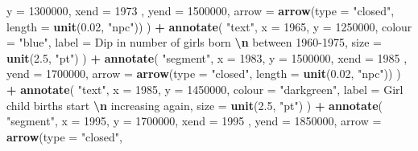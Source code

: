 \documentclass[11pt,a4paper,]{article}
\newenvironment{Shaded}{\begin{snugshade}}{\end{snugshade}}
\newcommand{\AttributeTok}[1]{\textcolor[rgb]{0.13,0.29,0.53}{#1}}
\newcommand{\DecValTok}[1]{\textcolor[rgb]{0.00,0.00,0.81}{#1}}
\newcommand{\FloatTok}[1]{\textcolor[rgb]{0.00,0.00,0.81}{#1}}
\newcommand{\FunctionTok}[1]{\textcolor[rgb]{0.13,0.29,0.53}{\textbf{#1}}}
\newcommand{\NormalTok}[1]{#1}
\newcommand{\SpecialCharTok}[1]{\textcolor[rgb]{0.81,0.36,0.00}{\textbf{#1}}}
\newcommand{\StringTok}[1]{\textcolor[rgb]{0.31,0.60,0.02}{#1}}
\begin{document}
\begin{Shaded}
\begin{Highlighting}[]
    \AttributeTok{y =} \DecValTok{1300000}\NormalTok{,}
    \AttributeTok{xend =} \DecValTok{1973}\NormalTok{  ,}
    \AttributeTok{yend =} \DecValTok{1500000}\NormalTok{,}
    \AttributeTok{arrow =} \FunctionTok{arrow}\NormalTok{(}\AttributeTok{type =} \StringTok{"closed"}\NormalTok{,}
                  \AttributeTok{length =} \FunctionTok{unit}\NormalTok{(}\FloatTok{0.02}\NormalTok{, }\StringTok{"npc"}\NormalTok{))}
\NormalTok{  ) }\SpecialCharTok{+}
  \FunctionTok{annotate}\NormalTok{(}
    \StringTok{"text"}\NormalTok{,}
    \AttributeTok{x =} \DecValTok{1965}\NormalTok{,}
    \AttributeTok{y =} \DecValTok{1250000}\NormalTok{,}
    \AttributeTok{colour =} \StringTok{"blue"}\NormalTok{,}
    \AttributeTok{label =} \StringTok{\textquotesingle{}Dip in number of girls born }\SpecialCharTok{\textbackslash{}n}\StringTok{ between 1960{-}1975\textquotesingle{}}\NormalTok{,}
    \AttributeTok{size =} \FunctionTok{unit}\NormalTok{(}\FloatTok{2.5}\NormalTok{, }\StringTok{"pt"}\NormalTok{)}
\NormalTok{  ) }\SpecialCharTok{+}
  \FunctionTok{annotate}\NormalTok{(}
    \StringTok{"segment"}\NormalTok{,}
    \AttributeTok{x =} \DecValTok{1983}\NormalTok{,}
    \AttributeTok{y =} \DecValTok{1500000}\NormalTok{,}
    \AttributeTok{xend =} \DecValTok{1985}\NormalTok{  ,}
    \AttributeTok{yend =} \DecValTok{1700000}\NormalTok{,}
    \AttributeTok{arrow =} \FunctionTok{arrow}\NormalTok{(}\AttributeTok{type =} \StringTok{"closed"}\NormalTok{,}
                  \AttributeTok{length =} \FunctionTok{unit}\NormalTok{(}\FloatTok{0.02}\NormalTok{, }\StringTok{"npc"}\NormalTok{))}
\NormalTok{  ) }\SpecialCharTok{+}
  \FunctionTok{annotate}\NormalTok{(}
    \StringTok{"text"}\NormalTok{,}
    \AttributeTok{x =} \DecValTok{1985}\NormalTok{,}
    \AttributeTok{y =} \DecValTok{1450000}\NormalTok{,}
    \AttributeTok{colour =} \StringTok{"darkgreen"}\NormalTok{,}
    \AttributeTok{label =} \StringTok{\textquotesingle{}Girl child births start }\SpecialCharTok{\textbackslash{}n}\StringTok{ increasing again\textquotesingle{}}\NormalTok{,}
    \AttributeTok{size =} \FunctionTok{unit}\NormalTok{(}\FloatTok{2.5}\NormalTok{, }\StringTok{"pt"}\NormalTok{)}
\NormalTok{  ) }\SpecialCharTok{+}
    \FunctionTok{annotate}\NormalTok{(}
    \StringTok{"segment"}\NormalTok{,}
    \AttributeTok{x =} \DecValTok{1995}\NormalTok{,}
    \AttributeTok{y =} \DecValTok{1700000}\NormalTok{,}
    \AttributeTok{xend =} \DecValTok{1995}\NormalTok{  ,}
    \AttributeTok{yend =} \DecValTok{1850000}\NormalTok{,}
    \AttributeTok{arrow =} \FunctionTok{arrow}\NormalTok{(}\AttributeTok{type =} \StringTok{"closed"}\NormalTok{,}

\end{Highlighting}
\end{Shaded}
\end{document}
